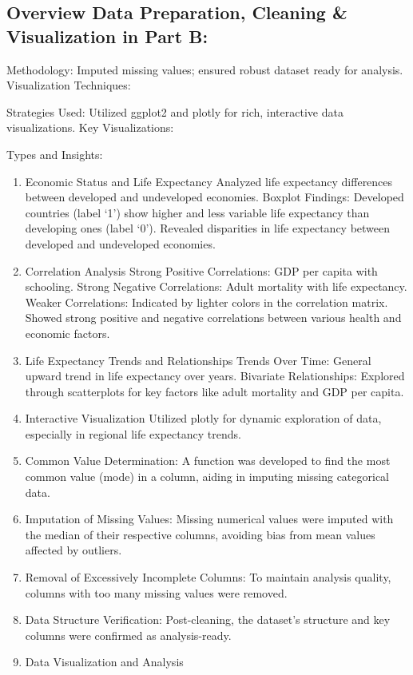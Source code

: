 \documentclass[
]{article}
\begin{document}
\hypertarget{overview-data-preparation-cleaning-visualization-in-part-b}{%
\subsection{Overview Data Preparation, Cleaning \& Visualization in Part
B:}\label{overview-data-preparation-cleaning-visualization-in-part-b}}

Methodology: Imputed missing values; ensured robust dataset ready for
analysis. Visualization Techniques:

Strategies Used: Utilized ggplot2 and plotly for rich, interactive data
visualizations. Key Visualizations:

Types and Insights:

\begin{enumerate}
\def\labelenumi{\arabic{enumi}.}
\item
  Economic Status and Life Expectancy Analyzed life expectancy
  differences between developed and undeveloped economies. Boxplot
  Findings: Developed countries (label `1') show higher and less
  variable life expectancy than developing ones (label `0'). Revealed
  disparities in life expectancy between developed and undeveloped
  economies.
\item
  Correlation Analysis Strong Positive Correlations: GDP per capita with
  schooling. Strong Negative Correlations: Adult mortality with life
  expectancy. Weaker Correlations: Indicated by lighter colors in the
  correlation matrix. Showed strong positive and negative correlations
  between various health and economic factors.
\item
  Life Expectancy Trends and Relationships Trends Over Time: General
  upward trend in life expectancy over years. Bivariate Relationships:
  Explored through scatterplots for key factors like adult mortality and
  GDP per capita.
\item
  Interactive Visualization Utilized plotly for dynamic exploration of
  data, especially in regional life expectancy trends.
\item
  Common Value Determination: A function was developed to find the most
  common value (mode) in a column, aiding in imputing missing
  categorical data.
\item
  Imputation of Missing Values: Missing numerical values were imputed
  with the median of their respective columns, avoiding bias from mean
  values affected by outliers.
\item
  Removal of Excessively Incomplete Columns: To maintain analysis
  quality, columns with too many missing values were removed.
\item
  Data Structure Verification: Post-cleaning, the dataset's structure
  and key columns were confirmed as analysis-ready.
\item
  Data Visualization and Analysis


\end{enumerate}
\end{document}
